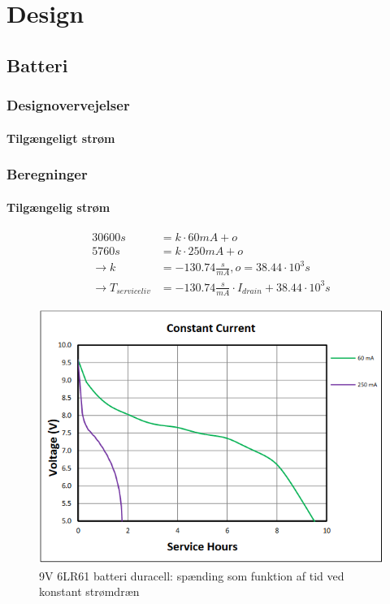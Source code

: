 \documentclass[../main.tex]{subfiles}
\begin{document}
\chapter{Design} \label{Chap:Design}

\section{Batteri}

\subsection{Designovervejelser}


\subsubsection{Tilgængeligt strøm}




\subsection{Beregninger}
\subsubsection{Tilgængelig strøm}


\begin{align*}
    30600s &= k \cdot 60mA + o \\
    5760s &= k \cdot 250mA + o \\
    \rightarrow k &= -130.74 \frac{s}{mA}, o = 38.44\cdot 10^3s\\
    \rightarrow T_{serviceliv} &= -130.74\frac{s}{mA} \cdot I_{drain} + 38.44\cdot 10^3s
\end{align*}


 \begin{figure}[H]
    \centering
    \includegraphics[scale=0.8]{Pictures/Grafer/Stroemogspaendingskurve.png}
    \captionsetup{format=hang}
    \caption{9V 6LR61 batteri duracell: spænding som funktion af tid ved konstant strømdræn}
    \label{fig: batstrømkurve}
\end{figure}
\end{document}
